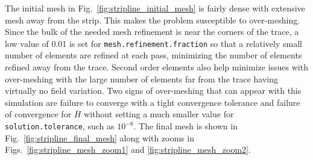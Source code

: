 \documentclass[titlepage]{article}
\renewcommand\_{\textunderscore\linebreak[1]}
\begin{document}
The initial mesh in Fig.~\ref{fig:stripline_initial_mesh} is fairly dense with extensive mesh away from the strip.  This makes the problem susceptible to over-meshing.  Since the bulk of the needed mesh refinement is near the corners of the trace, a low value of 0.01 is set for \texttt{mesh.refinement.fraction} so that a relatively small number of elements are refined at each pass, minimizing the number of elements refined away from the trace. Second order elements also help minimize issues with over-meshing with the large number of elements far from the trace having virtually no field variation.  Two signs of over-meshing that can appear with this simulation are failure to converge with a tight convergence tolerance and failure of convergence for $\overline{H}$ without setting a much smaller value for \texttt{solution.tolerance}, such as $10^{-8}$. The final mesh is shown in Fig.~\ref{fig:stripline_final_mesh} along with zooms in Figs.~\ref{fig:stripline_mesh_zoom1} and \ref{fig:stripline_mesh_zoom2}.
\end{document}
